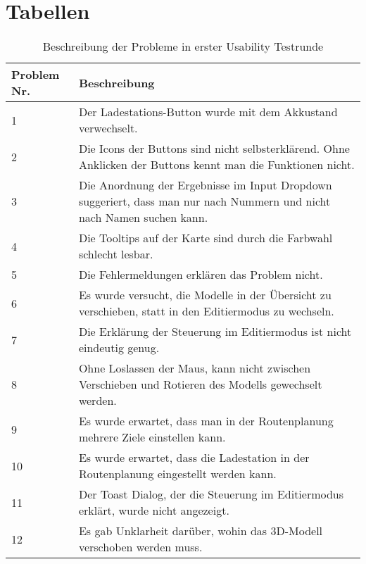 \section{Tabellen}
\begin{table}[H]
    \caption{Beschreibung der Probleme in erster Usability Testrunde}\label{tbl:1stUsabilityTestsProblemsDesc}
    \begin{tabular}{l|l}
        Problem Nr. & Beschreibung \\ \hline
        1           & \multicolumn{1}{p{12cm}}{Der Ladestations-Button wurde mit dem Akkustand verwechselt.} \\ \hline
        2           & \multicolumn{1}{p{12cm}}{Die Icons der Buttons sind nicht selbsterklärend. Ohne Anklicken der Buttons kennt man die Funktionen nicht.} \\ \hline
        3           & \multicolumn{1}{p{12cm}}{Die Anordnung der Ergebnisse im Input Dropdown suggeriert, dass man nur nach Nummern und nicht nach Namen suchen kann.} \\ \hline
        4           & \multicolumn{1}{p{12cm}}{Die Tooltips auf der Karte sind durch die Farbwahl schlecht lesbar.} \\ \hline
        5           & \multicolumn{1}{p{12cm}}{Die Fehlermeldungen erklären das Problem nicht.} \\ \hline
        6           & \multicolumn{1}{p{12cm}}{Es wurde versucht, die Modelle in der Übersicht zu verschieben, statt in den Editiermodus zu wechseln.} \\ \hline
        7           & \multicolumn{1}{p{12cm}}{Die Erklärung der Steuerung im Editiermodus ist nicht eindeutig genug.} \\ \hline
        8           & \multicolumn{1}{p{12cm}}{Ohne Loslassen der Maus, kann nicht zwischen Verschieben und Rotieren des Modells gewechselt werden.} \\ \hline
        9           & \multicolumn{1}{p{12cm}}{Es wurde erwartet, dass man in der Routenplanung mehrere Ziele einstellen kann.} \\ \hline
        10          & \multicolumn{1}{p{12cm}}{Es wurde erwartet, dass die Ladestation in der Routenplanung eingestellt werden kann.} \\ \hline
        11          & \multicolumn{1}{p{12cm}}{Der Toast Dialog, der die Steuerung im Editiermodus erklärt, wurde nicht angezeigt.} \\ \hline
        12          & \multicolumn{1}{p{12cm}}{Es gab Unklarheit darüber, wohin das 3D-Modell verschoben werden muss.} \\ \hline

\end{tabular}
\end{table}
